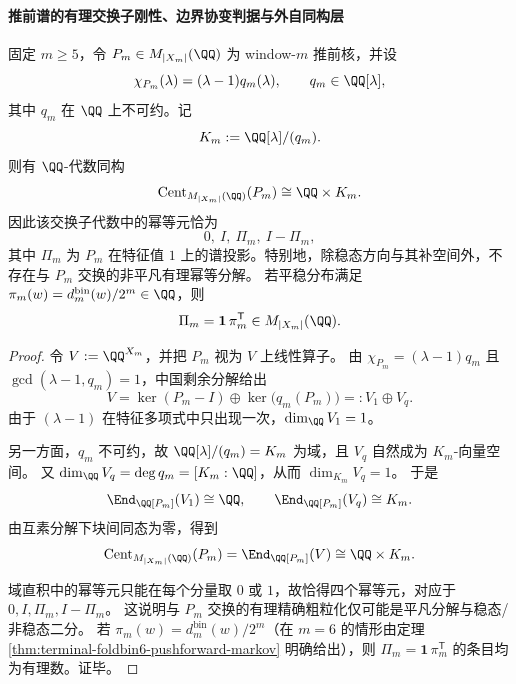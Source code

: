 \paragraph{推前谱的有理交换子刚性、边界协变判据与外自同构层}

\begin{theorem}[推前谱的有理交换子分解与幂等刚性]\label{thm:terminal-windowm-rational-commutant-idempotent-rigidity}
固定 \(m\ge 5\)，令 \(P_m\in M_{|X_m|}(\QQ)\) 为 window-\(m\) 推前核，并设
\[
\chi_{P_m}(\lambda)=(\lambda-1)q_m(\lambda),\qquad q_m\in\QQ[\lambda],
\]
其中 \(q_m\) 在 \(\QQ\) 上不可约。记
\[
K_m:=\QQ[\lambda]/(q_m).
\]
则有 \(\QQ\)-代数同构
\[
\operatorname{Cent}_{M_{|X_m|}(\QQ)}(P_m)\cong \QQ\times K_m.
\]
因此该交换子代数中的幂等元恰为
\[
0,\ I,\ \Pi_m,\ I-\Pi_m,
\]
其中 \(\Pi_m\) 为 \(P_m\) 在特征值 \(1\) 上的谱投影。特别地，除稳态方向与其补空间外，不存在与 \(P_m\) 交换的非平凡有理幂等分解。
若平稳分布满足 \(\pi_m(w)=d^{\mathrm{bin}}_m(w)/2^m\in\QQ\)，则
\[
\Pi_m=\mathbf{1}\,\pi_m^{\mathsf T}\in M_{|X_m|}(\QQ).
\]
\end{theorem}
\begin{proof}
令 \(V:=\QQ^{X_m}\)，并把 \(P_m\) 视为 \(V\) 上线性算子。
由 \(\chi_{P_m}=(\lambda-1)q_m\) 且 \(\gcd(\lambda-1,q_m)=1\)，中国剩余分解给出
\[
V=\ker(P_m-I)\oplus\ker\bigl(q_m(P_m)\bigr)=:V_1\oplus V_q.
\]
由于 \((\lambda-1)\) 在特征多项式中只出现一次，\(\dim_{\QQ}V_1=1\)。

另一方面，\(q_m\) 不可约，故 \(\QQ[\lambda]/(q_m)=K_m\) 为域，且 \(V_q\) 自然成为 \(K_m\)-向量空间。
又 \(\dim_{\QQ}V_q=\deg q_m=[K_m:\QQ]\)，从而 \(\dim_{K_m}V_q=1\)。
于是
\[
\End_{\QQ[P_m]}(V_1)\cong \QQ,\qquad
\End_{\QQ[P_m]}(V_q)\cong K_m.
\]
由互素分解下块间同态为零，得到
\[
\operatorname{Cent}_{M_{|X_m|}(\QQ)}(P_m)
=\End_{\QQ[P_m]}(V)
\cong \QQ\times K_m.
\]

域直积中的幂等元只能在每个分量取 \(0\) 或 \(1\)，故恰得四个幂等元，对应于
\(0,I,\Pi_m,I-\Pi_m\)。
这说明与 \(P_m\) 交换的有理精确粗粒化仅可能是平凡分解与稳态/非稳态二分。
若 \(\pi_m(w)=d^{\mathrm{bin}}_m(w)/2^m\)（在 \(m=6\) 的情形由定理 \ref{thm:terminal-foldbin6-pushforward-markov} 明确给出），则 \(\Pi_m=\mathbf{1}\,\pi_m^{\mathsf T}\) 的条目均为有理数。证毕。
\end{proof}

